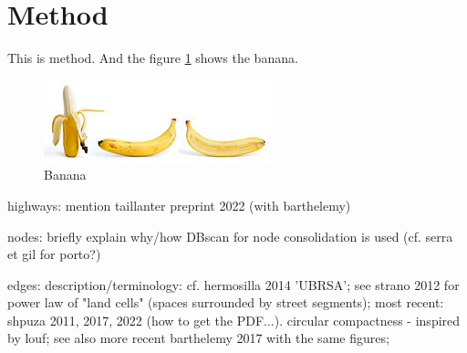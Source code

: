 \section{Method}
\label{sec:method}

This is method. And the figure \ref{fig:banana} shows the banana.

\begin{figure}
    \includegraphics[width=\textwidth]{figures/banana.jpg}
    \caption{Banana}
    \label{fig:banana}
\end{figure}

highways: mention taillanter preprint 2022 (with barthelemy)

nodes: briefly explain why/how DBscan for node consolidation is used (cf. serra et gil for porto?)

edges: description/terminology: cf. hermosilla 2014 'UBRSA'; see strano 2012 for power law of "land cells" (spaces surrounded by street segments); most recent: shpuza 2011, 2017, 2022 (how to get the PDF...). circular compactness - inspired by louf; see also more recent barthelemy 2017 with the same figures;
